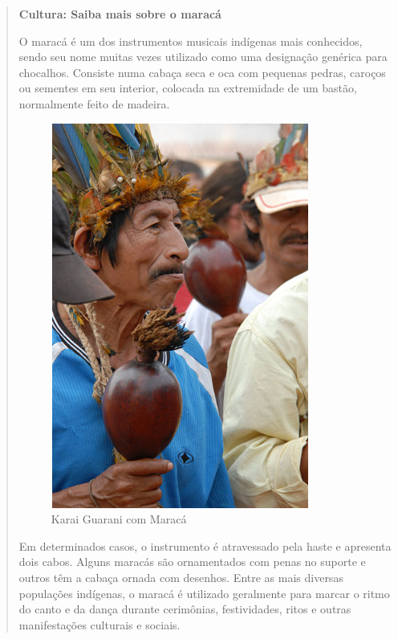 \begin{quote}
\textbf{Cultura: Saiba mais sobre o maracá}

O maracá é um dos instrumentos musicais indígenas mais conhecidos, sendo
seu nome muitas vezes utilizado como uma designação genérica para
chocalhos. Consiste numa cabaça seca e oca com pequenas pedras, caroços
ou sementes em seu interior, colocada na extremidade de um bastão,
normalmente feito de madeira.

\begin{figure}
\includegraphics[width=.5\textwidth]{./imgs/art18.png}
\caption{Karai Guarani com Maracá}
\end{figure}

Em determinados casos, o instrumento é atravessado pela haste e
apresenta dois cabos. Alguns maracás são ornamentados com penas no
suporte e outros têm a cabaça ornada com desenhos. Entre as mais
diversas populações indígenas, o maracá é utilizado geralmente para
marcar o ritmo do canto e da dança durante cerimônias, festividades,
ritos e outras manifestações culturais e sociais.



\end{quote}

